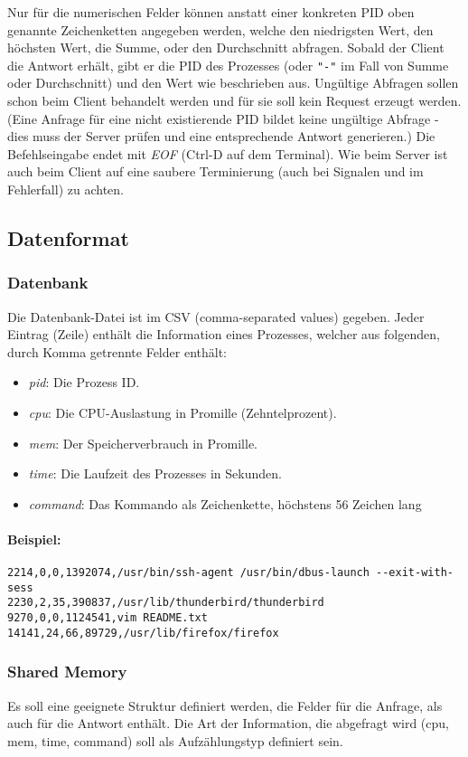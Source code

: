 Nur für die numerischen Felder können anstatt einer konkreten PID oben genannte
Zeichenketten angegeben werden, welche den niedrigsten Wert, den höchsten Wert,
die Summe, oder den Durchschnitt abfragen.
%
Sobald der Client die Antwort erhält, gibt er die PID des Prozesses (oder
\texttt{"{}-"{}} im Fall von Summe oder Durchschnitt) und den Wert
wie beschrieben aus.
%
Ungültige Abfragen sollen schon beim Client behandelt werden und für sie
soll kein Request erzeugt werden.
(Eine Anfrage für eine nicht existierende PID bildet keine ungültige Abfrage
- dies muss der Server prüfen und eine entsprechende Antwort generieren.)
%
Die Befehlseingabe endet mit \emph{EOF} (Ctrl-D auf dem Terminal).
Wie beim Server ist auch beim Client auf eine saubere Terminierung (auch bei
Signalen und im Fehlerfall) zu achten.



\subsection*{Datenformat}

\subsubsection*{Datenbank}

Die Datenbank-Datei ist im CSV (comma-separated values) gegeben.
Jeder Eintrag (Zeile) enthält die Information eines Prozesses, welcher
aus folgenden, durch Komma getrennte Felder enthält:

\begin{itemize}
  \item \emph{pid}: Die Prozess ID.
  \item \emph{cpu}: Die CPU-Auslastung in Promille (Zehntelprozent).
  \item \emph{mem}: Der Speicherverbrauch in Promille.
  \item \emph{time}: Die Laufzeit des Prozesses in Sekunden.
  \item \emph{command}: Das Kommando als Zeichenkette, höchstens 56
    Zeichen lang
\end{itemize}

\paragraph{Beispiel:}

\begin{verbatim}
2214,0,0,1392074,/usr/bin/ssh-agent /usr/bin/dbus-launch --exit-with-sess
2230,2,35,390837,/usr/lib/thunderbird/thunderbird
9270,0,0,1124541,vim README.txt
14141,24,66,89729,/usr/lib/firefox/firefox
\end{verbatim}



\subsubsection*{Shared Memory}

Es soll eine geeignete Struktur definiert werden, die Felder für die Anfrage,
als auch für die Antwort enthält. Die Art der Information, die abgefragt wird
(cpu, mem, time, command) soll als Aufzählungstyp definiert sein.





\osueguidelinesthree


